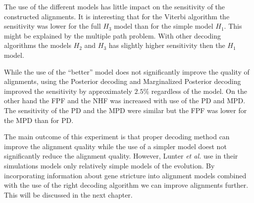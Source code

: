 The use of the different models has little impact on the sensitivity of the
constructed alignments. It is interesting that for the Viterbi algorithm the
sensitivity was lower for the full $H_3$ model than for the simple model $H_1$.
This might be explained by the multiple path problem.  With other decoding
algorithms the models $H_2$ and $H_3$ has slightly higher sensitivity then the
$H_1$ model. 

While the use of the ``better'' model does not significantly improve the quality
of alignments, using the Posterior decoding and Marginalized Posterior decoding
improved the sensitivity by approximately $2.5$\% regardless of the model. On
the other hand the FPF and the NHF was increased with use of the PD and MPD. The
sensitivity of the PD and the MPD were similar but the FPF was lower for the MPD
than for PD. 

The main outcome of this experiment is that proper decoding method can improve
the alignment quality while the use of a simpler model doest not significantly
reduce the alignment quality. However, Lunter {\it et al.} use in their
simulations models only relatively simple models of the evolution. By
incorporating information about gene stricture into alignment models combined
with the use of the right decoding algorithm we can improve alignments further.
This will be discussed in the next chapter. 


